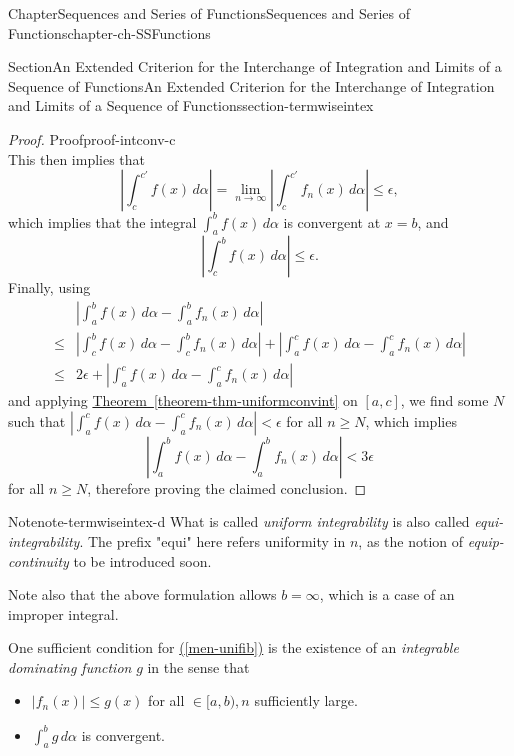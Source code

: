 \documentclass[oneside,10pt,]{book}
\newcommand{\xreffont}{\relax}
\numberwithin{equation}{section}
\newcommand{\amp}{&}
\begin{document}
\begin{chapterptx}{Chapter}{Sequences and Series of Functions}{}{Sequences and Series of Functions}{}{}{chapter-ch-SSFunctions}
\begin{sectionptx}{Section}{An Extended Criterion for the Interchange of Integration and Limits  of a Sequence of Functions}{}{An Extended Criterion for the Interchange of Integration and Limits  of a Sequence of Functions}{}{}{section-termwiseintex}
\begin{proof}{Proof}{}{proof-intconv-c}
\begin{equation*}
\end{equation*}
This then implies that%
\begin{equation*}
\left|\int_{c}^{c'} f(x)\, d\alpha \right| =\lim_{n\to \infty }  \left|\int_{c}^{c'} f_{n}(x)\, d\alpha \right| 
\le \epsilon,
\end{equation*}
which implies that the integral \(\int_{a}^{b} f(x)\, d\alpha\) is convergent at \(x=b\), and%
\begin{equation*}
\left|\int_{c}^{b} f(x)\, d\alpha  \right| \le  \epsilon.
\end{equation*}
Finally, using%
\begin{align*}
\amp \left| \int_{a}^{b} f(x)\, d\alpha - \int_{a}^{b} f_{n}(x)\, d\alpha \right| \\
\le \amp \left|\int_{c}^{b} f(x)\, d\alpha - \int_{c}^{b} f_{n}(x)\, d\alpha \right|
+ \left| \int_{a}^{c} f(x)\, d\alpha - \int_{a}^{c} f_{n}(x)\, d\alpha \right|\\
\le \amp 2\epsilon + \left| \int_{a}^{c} f(x)\, d\alpha - \int_{a}^{c} f_{n}(x)\, d\alpha \right|
\end{align*}
and applying \hyperref[theorem-thm-uniformconvint]{Theorem~{\xreffont\ref{theorem-thm-uniformconvint}}} on \([a, c]\), we find some \(N\) such that \(\left| \int_{a}^{c} f(x)\, d\alpha - \int_{a}^{c} f_{n}(x)\, d\alpha \right| < \epsilon\) for all \(n\ge N\), which implies%
\begin{equation*}
\left| \int_{a}^{b} f(x)\, d\alpha - \int_{a}^{b} f_{n}(x)\, d\alpha \right| < 3\epsilon
\end{equation*}
for all \(n\ge N\), therefore proving the claimed conclusion.\end{proof}
\begin{note}{Note}{}{note-termwiseintex-d}%
What is called \emph{uniform integrability} is also called \emph{equi-integrability}. The prefix "equi" here refers uniformity in \(n\), as the notion of \emph{equip-continuity} to be introduced soon.%
\par
Note also that the above formulation allows \(b=\infty\), which is a case of an improper integral.%
\par
One sufficient condition for \hyperref[men-unifib]{({\xreffont\ref{men-unifib}})} is the existence of an \emph{integrable dominating function} \(g\) in the sense  that%
\begin{itemize}[label=\textbullet]
\item{}\(|f_{n}(x)|\le g(x) \) for all \(\in [a, b), n\) sufficiently large.%
\item{}\(\int_{a}^{b} g\, d\alpha\) is convergent.%

\end{itemize}
\end{note}
\end{sectionptx}
\end{chapterptx}
\end{document}
